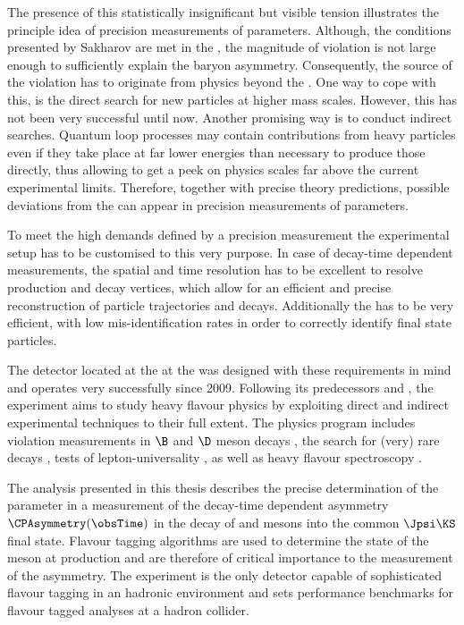 The presence of this statistically insignificant but visible tension illustrates
the principle idea of precision measurements of \CKM parameters. Although, the
conditions presented by Sakharov are met in the \SM, the magnitude of \CP
violation is not large enough to sufficiently explain the baryon asymmetry.
Consequently, the source of the \CP violation has to originate from physics
beyond the \SM. One way to cope with this, is the direct search for new
particles at higher mass scales. However, this has not been very successful
until now. Another promising way is to conduct indirect searches. Quantum loop
processes may contain contributions from heavy particles even if they take place
at far lower energies than necessary to produce those directly, thus allowing to
get a peek on physics scales far above the current experimental limits.
Therefore, together with precise theory predictions, possible deviations from
the \SM can appear in precision measurements of \SM parameters.

To meet the high demands defined by a precision measurement the experimental
setup has to be customised to this very purpose. In case of decay-time dependent
measurements, the spatial and time resolution has to be excellent to resolve
production and decay vertices, which allow for an efficient and precise
reconstruction of particle trajectories and decays. Additionally the \PID has to
be very efficient, with low mis-identification rates in order to correctly
identify final state particles.

The \LHCb detector located at the \LHC at the \CERN was designed with these
requirements in mind and operates very successfully since 2009. Following its
predecessors \Babar and \Belle, the \LHCb experiment aims to study heavy flavour
physics by exploiting direct and indirect experimental techniques to their full
extent. The physics program includes \CP violation measurements in $\B$ and $\D$
meson decays
\cite{Aaij:2015tza,Aaij:2015yda,Aaij:2014uva,Aaij:2014fba,Aaij:2014dka,Aaij:2014zsa,Aaij:2014kxa}, 
the search for (very) rare decays \cite{CMS:2014xfa}, tests of
lepton-universality \cite{Aaij:2014ora,Aaij:2015yra}, as well as heavy flavour
spectroscopy \cite{Aaij:2014yka,Aaij:2015tga}.

The analysis presented in this thesis describes the precise determination of the
\CKM parameter \sintwobeta in a measurement of the decay-time dependent \CP
asymmetry $\CPAsymmetry(\obsTime)$ in the decay of \Bd and \Bdbar mesons into
the common $\Jpsi\KS$ final state. Flavour tagging algorithms are used to
determine the state of the \B meson at production and are therefore of critical
importance to the measurement of the \CP asymmetry. The \LHCb experiment is the
only detector capable of sophisticated flavour tagging in an hadronic
environment and sets performance benchmarks for flavour tagged \CP analyses at a
hadron collider.

